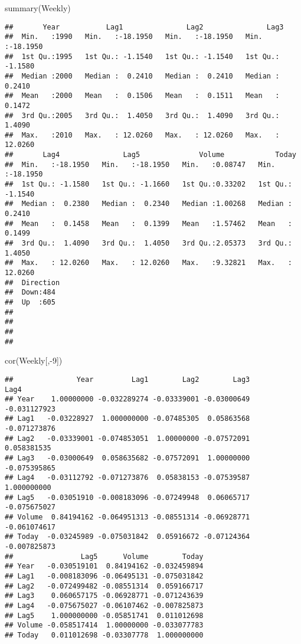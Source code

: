 \documentclass[
]{article}
\newenvironment{Shaded}{\begin{snugshade}}{\end{snugshade}}
\newcommand{\DecValTok}[1]{\textcolor[rgb]{0.00,0.00,0.81}{#1}}
\newcommand{\FunctionTok}[1]{\textcolor[rgb]{0.00,0.00,0.00}{#1}}
\newcommand{\NormalTok}[1]{#1}
\newcommand{\SpecialCharTok}[1]{\textcolor[rgb]{0.00,0.00,0.00}{#1}}
\begin{document}
\begin{Shaded}
\begin{Highlighting}[]
\FunctionTok{summary}\NormalTok{(Weekly)}
\end{Highlighting}
\end{Shaded}

\begin{verbatim}
##       Year           Lag1               Lag2               Lag3         
##  Min.   :1990   Min.   :-18.1950   Min.   :-18.1950   Min.   :-18.1950  
##  1st Qu.:1995   1st Qu.: -1.1540   1st Qu.: -1.1540   1st Qu.: -1.1580  
##  Median :2000   Median :  0.2410   Median :  0.2410   Median :  0.2410  
##  Mean   :2000   Mean   :  0.1506   Mean   :  0.1511   Mean   :  0.1472  
##  3rd Qu.:2005   3rd Qu.:  1.4050   3rd Qu.:  1.4090   3rd Qu.:  1.4090  
##  Max.   :2010   Max.   : 12.0260   Max.   : 12.0260   Max.   : 12.0260  
##       Lag4               Lag5              Volume            Today         
##  Min.   :-18.1950   Min.   :-18.1950   Min.   :0.08747   Min.   :-18.1950  
##  1st Qu.: -1.1580   1st Qu.: -1.1660   1st Qu.:0.33202   1st Qu.: -1.1540  
##  Median :  0.2380   Median :  0.2340   Median :1.00268   Median :  0.2410  
##  Mean   :  0.1458   Mean   :  0.1399   Mean   :1.57462   Mean   :  0.1499  
##  3rd Qu.:  1.4090   3rd Qu.:  1.4050   3rd Qu.:2.05373   3rd Qu.:  1.4050  
##  Max.   : 12.0260   Max.   : 12.0260   Max.   :9.32821   Max.   : 12.0260  
##  Direction 
##  Down:484  
##  Up  :605  
##            
##            
##            
## 
\end{verbatim}

\begin{Shaded}
\begin{Highlighting}[]
\FunctionTok{cor}\NormalTok{(Weekly[,}\SpecialCharTok{{-}}\DecValTok{9}\NormalTok{])}
\end{Highlighting}
\end{Shaded}

\begin{verbatim}
##               Year         Lag1        Lag2        Lag3         Lag4
## Year    1.00000000 -0.032289274 -0.03339001 -0.03000649 -0.031127923
## Lag1   -0.03228927  1.000000000 -0.07485305  0.05863568 -0.071273876
## Lag2   -0.03339001 -0.074853051  1.00000000 -0.07572091  0.058381535
## Lag3   -0.03000649  0.058635682 -0.07572091  1.00000000 -0.075395865
## Lag4   -0.03112792 -0.071273876  0.05838153 -0.07539587  1.000000000
## Lag5   -0.03051910 -0.008183096 -0.07249948  0.06065717 -0.075675027
## Volume  0.84194162 -0.064951313 -0.08551314 -0.06928771 -0.061074617
## Today  -0.03245989 -0.075031842  0.05916672 -0.07124364 -0.007825873
##                Lag5      Volume        Today
## Year   -0.030519101  0.84194162 -0.032459894
## Lag1   -0.008183096 -0.06495131 -0.075031842
## Lag2   -0.072499482 -0.08551314  0.059166717
## Lag3    0.060657175 -0.06928771 -0.071243639
## Lag4   -0.075675027 -0.06107462 -0.007825873
## Lag5    1.000000000 -0.05851741  0.011012698
## Volume -0.058517414  1.00000000 -0.033077783
## Today   0.011012698 -0.03307778  1.000000000
\end{verbatim}
\end{document}
